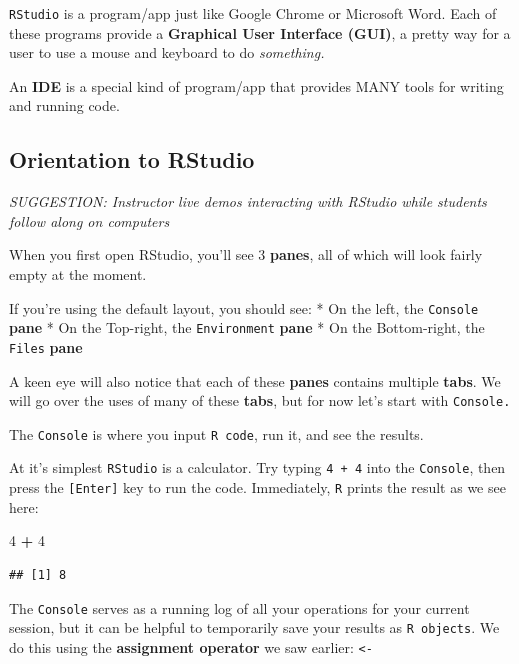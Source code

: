 \documentclass[
]{book}
\newenvironment{Shaded}{\begin{snugshade}}{\end{snugshade}}
\newcommand{\DecValTok}[1]{\textcolor[rgb]{0.00,0.00,0.81}{#1}}
\newcommand{\SpecialCharTok}[1]{\textcolor[rgb]{0.81,0.36,0.00}{\textbf{#1}}}
\begin{document}
\texttt{RStudio} is a program/app just like Google Chrome or Microsoft Word. Each
of these programs provide a \textbf{Graphical User Interface (GUI)}, a pretty way for
a user to use a mouse and keyboard to do \emph{something.}

An \textbf{IDE} is a special kind of program/app that provides MANY tools for writing and running code.

\hypertarget{orientation-to-rstudio}{%
\subsection{Orientation to RStudio}\label{orientation-to-rstudio}}

\emph{SUGGESTION: Instructor live demos interacting with RStudio while students follow along on computers}

When you first open RStudio, you'll see 3 \textbf{panes}, all of which will look fairly empty at the moment.

If you're using the default layout, you should see:
* On the left, the \texttt{Console} \textbf{pane}
* On the Top-right, the \texttt{Environment} \textbf{pane}
* On the Bottom-right, the \texttt{Files} \textbf{pane}

A keen eye will also notice that each of these \textbf{panes} contains multiple \textbf{tabs}. We will go over the uses of many of these \textbf{tabs}, but for now let's start with \texttt{Console.}

The \texttt{Console} is where you input \texttt{R\ code}, run it, and see the results.

At it's simplest \texttt{RStudio} is a calculator. Try typing \texttt{4\ +\ 4} into the \texttt{Console},
then press the \texttt{{[}Enter{]}} key to run the code. Immediately, \texttt{R} prints the result as we see here:

\begin{Shaded}
\begin{Highlighting}[]
\DecValTok{4} \SpecialCharTok{+} \DecValTok{4}
\end{Highlighting}
\end{Shaded}

\begin{verbatim}
## [1] 8
\end{verbatim}

The \texttt{Console} serves as a running log of all your operations for your current session, but it can be helpful to temporarily save your results as \texttt{R\ objects}. We do this using the \textbf{assignment operator} we saw earlier: \texttt{\textless{}-}
\end{document}
